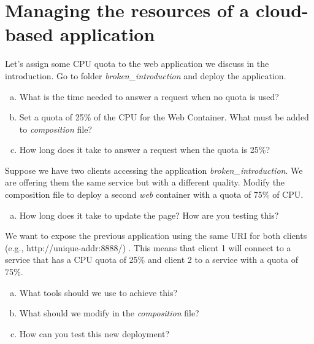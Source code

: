 \documentclass[a4paper,11pt]{exam}
\begin{document}
\section{Managing the resources of a cloud-based application}
\begin{questions}
	\question Let's assign some CPU quota to the web application we discuss in the introduction. Go to folder \textit{broken\_introduction} and deploy the application.
	
	\begin{enumerate}[(a)] %
		\item What is the time needed to answer a request when no quota is used?
		\item Set a quota of 25\% of the CPU for the Web Container. What must be added to \textit{composition} file? 
		\item How long does it take to answer a request when the quota is 25\%?
	\end{enumerate}
	
	\question Suppose we have two clients accessing the application \textit{broken\_introduction}. We are offering them the same service but with a different quality. Modify the composition file to deploy a second \textit{web} container with a quota of 75\% of CPU.
	
	\begin{enumerate}[(a)] %
	 	\item How long does it take to update the page? How are you testing this?
	\end{enumerate}
	
	\question We want to expose the previous application using the same URI for both clients (e.g., http://unique-addr:8888/) . This means that client 1 will connect to a service that has a CPU quota of 25\% and client 2 to a service with a quota of 75\%.
	 
	\begin{enumerate}[(a)] %
		\item What tools should we use to achieve this?
		\item What should we modify in the \textit{composition} file?
		\item How can you test this new deployment?
	\end{enumerate}
	
\end{questions}
\end{document}
